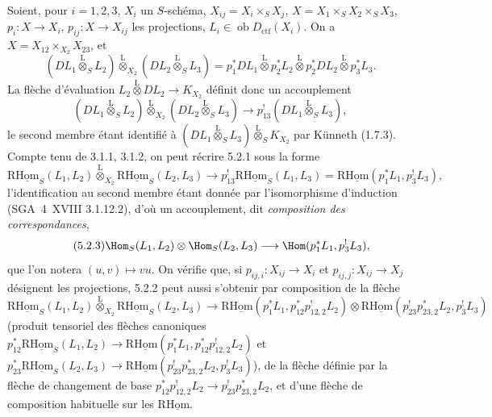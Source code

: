 Soient, pour $i=1,2,3$, $X_i$ un $S$-schéma, $X_{ij}=X_i\times_SX_j$, $X=X_1\times_SX_2\times_SX_3$, $p_i:X\to X_i$, $p_{ij}:X\to X_{ij}$ les projections, $L_i\in\operatorname{ob}D_{\mathrm{ctf}}(X_i)$. On a $X=X_{12}\times_{X_2}X_{23}$, et
\[
(DL_1\overset{\mathrm{L}}{\otimes}_SL_2)\overset{\mathrm{L}}{\otimes}_{X_2}(DL_2\overset{\mathrm{L}}{\otimes}_SL_3)
=p_1^*DL_1\overset{\mathrm{L}}{\otimes}p_2^*L_2\overset{\mathrm{L}}{\otimes}p_2^*DL_2\overset{\mathrm{L}}{\otimes}p_3^*L_3.
\]
La flèche d'évaluation $L_2\overset{\mathrm{L}}{\otimes}DL_2\to K_{X_2}$ définit donc un accouplement
\begin{equation}
\tag{5.2.1}
(DL_1\overset{\mathrm{L}}{\otimes}_SL_2)\overset{\mathrm{L}}{\otimes}_{X_2}(DL_2\overset{\mathrm{L}}{\otimes}_SL_3)\longrightarrow p_{13}^!(DL_1\overset{\mathrm{L}}{\otimes}_SL_3),
\end{equation}
le second membre étant identifié à $(DL_1\overset{\mathrm{L}}{\otimes}_SL_3)\overset{\mathrm{L}}{\otimes}_SK_{X_2}$ par Künneth (1.7.3). Compte tenu de 3.1.1, 3.1.2, on peut récrire 5.2.1 sous la forme
\begin{equation}
\tag{5.2.2}
\mathrm{R}\underline{\mathrm{Hom}}_S(L_1,L_2)\overset{\mathrm{L}}{\otimes}_{X_2}\mathrm{R}\underline{\mathrm{Hom}}_S(L_2,L_3)\longrightarrow p_{13}^!\mathrm{R}\underline{\mathrm{Hom}}_S(L_1,L_3)=\mathrm{R}\underline{\mathrm{Hom}}(p_1^*L_1,p_3^!L_3),
\end{equation}
l'identification au second membre étant donnée par l'isomorphisme d'induction (SGA~4~XVIII 3.1.12.2), d'où un accouplement, dit \emph{composition des correspondances},
\begin{equation}
\tag{5.2.3}
\Hom_S(L_1,L_2)\otimes\Hom_S(L_2,L_3)\longrightarrow\Hom(p_1^*L_1,p_3^!L_3),
\end{equation}
que l'on notera $(u,v)\mapsto vu$. On vérifie que, si $p_{ij,i}:X_{ij}\to X_i$ et $p_{ij,j}:X_{ij}\to X_j$ désignent les projections, 5.2.2 peut aussi s'obtenir par composition de la flèche
\[
\mathrm{R}\underline{\mathrm{Hom}}_S(L_1,L_2)\overset{\mathrm{L}}{\otimes}_{X_2}\mathrm{R}\underline{\mathrm{Hom}}_S(L_2,L_3)
\longrightarrow
\mathrm{R}\underline{\mathrm{Hom}}(p_1^*L_1,p_{12}^*p_{12,2}^!L_2)
\otimes
\mathrm{R}\underline{\mathrm{Hom}}(p_{23}^!p_{23,2}^*L_2,p_3^!L_3)
\]
(produit tensoriel des flèches canoniques $p_{12}^*\mathrm{R}\underline{\mathrm{Hom}}_S(L_1,L_2)\to\mathrm{R}\underline{\mathrm{Hom}}(p_1^*L_1,p_{12}^*p_{12,2}^!L_2)$ et $p_{23}^*\mathrm{R}\underline{\mathrm{Hom}}_S(L_2,L_3)\to\mathrm{R}\underline{\mathrm{Hom}}(p_{23}^!p_{23,2}^*L_2,p_3^!L_3)$), de la flèche définie par la flèche de changement de base $p_{12}^*p_{12,2}^!L_2\to p_{23}^!p_{23,2}^*L_2$, et d'une flèche de composition habituelle sur les $\mathrm{R}\underline{\mathrm{Hom}}$.

